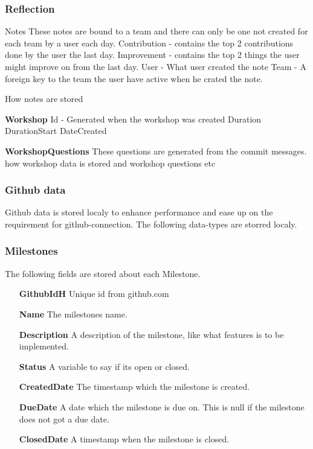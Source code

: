 \subsubsection{Reflection}
Notes
These notes are bound to a team and there can only be one not created for each team by a user each day.
Contribution - contains the top 2 contributions done by the user the last day.
Improvement - contains the top 2 things the user might improve on from the last day.
User - What user created the note
Team - A foreign key to the team the user have active when he crated the note.

How notes are stored

\textbf{Workshop} 
Id - Generated when the workshop was created
Duration
DurationStart
DateCreated


\textbf{WorkshopQuestions}
These questions are generated from the commit messages.
how workshop data is stored and workshop questions etc

\subsubsection{Github data}
Github data is stored localy to enhance performance and ease up on the requirement for github-connection. The following data-types are storred localy.

\subsubsection*{Milestones}
The following fields are stored about each Milestone.
\vspace{0.5cm}
\begin{itemize}
    \item[\textbf{GithubIdH}]{Unique id from github.com}
    \item[\textbf{Name}]{The milestones name.}
    \item[\textbf{Description}]{A description of the milestone, like what features is to be implemented.}
    \item[\textbf{Status}]{A variable to say if its open or closed.}
    \item[\textbf{CreatedDate}]{The timestamp which the milestone is created.}
    \item[\textbf{DueDate}]{A date which the milestone is due on. This is null if the milestone does not got a due date.}
    \item[\textbf{ClosedDate}]{A timestamp when the milestone is closed.}
\end{itemize}
\vspace{0.5cm}

